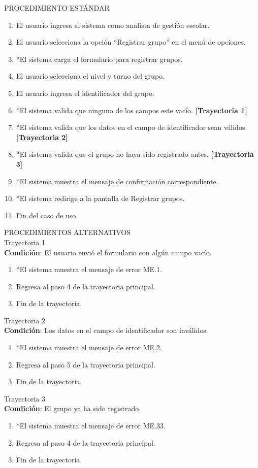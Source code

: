 \vspace*{1cm}
\noindent
\Large{PROCEDIMIENTO ESTÁNDAR}
\large{}
\begin{enumerate}
    \item El usuario ingresa al sistema como analista de gestión escolar.
    \item El usuario selecciona la opción “Registrar grupo” en el menú de opciones.
    \item *El sistema carga el formulario para registrar grupos.
    \item El usuario selecciona el nivel y turno del grupo.
    \item El usuario ingresa el identificador del grupo.
    \item *El sistema valida que ninguno de los campos este vacío. \textbf{[Trayectoria 1]}
    \item *El sistema valida que los datos en el campo de identificador sean válidos. \textbf{[Trayectoria 2]}
    \item *El sistema valida que el grupo no haya sido registrado antes. \textbf{[Trayectoria 3]}
    \item *El sistema muestra el mensaje de confirmación correspondiente.
    \item *El sistema redirige a la pantalla de Registrar grupos.
    \item Fin del caso de uso.
\end{enumerate}
\vspace*{1cm}
\Large{PROCEDIMIENTOS ALTERNATIVOS}\\
\large{Trayectoria 1}\\
\textbf{Condición}: El usuario envió el formulario con algún campo vacío.
\begin{enumerate}
    \item *El sistema muestra el mensaje de error ME.1.
    \item Regresa al paso 4 de la trayectoria principal.
    \item Fin de la trayectoria.
\end{enumerate}
\large{Trayectoria 2}\\
\textbf{Condición}: Los datos en el campo de identificador son inválidos.
\begin{enumerate}
    \item *El sistema muestra el mensaje de error ME.2.
    \item Regresa al paso 5 de la trayectoria principal.
    \item Fin de la trayectoria.
\end{enumerate}
\large{Trayectoria 3}\\
\textbf{Condición}: El grupo ya ha sido registrado.
\begin{enumerate}
    \item *El sistema muestra el mensaje de error ME.33.
    \item Regresa al paso 4 de la trayectoria principal.
    \item Fin de la trayectoria.
\end{enumerate}